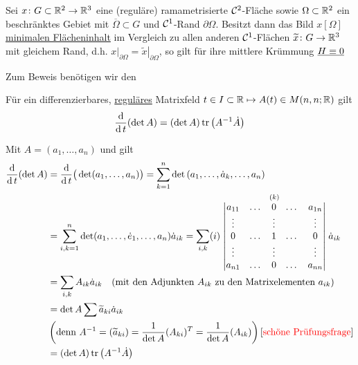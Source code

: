 \begin{satz}\label{satz261}
 Sei \(x \colon G \subset \mathbb{R}^2 \to \mathbb{R}^3\) eine (reguläre) ramametrisierte \(\mathcal{C}^2\)-Fläche sowie \(\Omega \subset \mathbb{R}^2\) ein beschränktes Gebiet mit \(\overline \Omega \subset G\) und \(\mathcal{C}^1\)-Rand \(\partial \Omega\). Besitzt dann das Bild \(x[\Omega]\) \uline{minimalen Flächeninhalt} im Vergleich zu allen anderen \(\mathcal{C}^1\)-Flächen \(\widetilde x \colon G \to \mathbb{R}^3\) mit gleichem Rand, d.h. \(\left. x \right|_{\partial \Omega} = \left. \widetilde x \right|_{\partial \Omega}\), so gilt für ihre mittlere Krümmung \(\uline{H \equiv 0}\)
\end{satz}

Zum Beweis benötigen wir den

\begin{hilfssatz}
 Für ein differenzierbares, \uline{reguläres} Matrixfeld \(t \in I \subset \mathbb{R} \mapsto A(t) \in M(n,n;\mathbb{R})\) gilt
 \[
  \frac{\operatorname{d}}{\operatorname{d} t}(\det A) = (\det A) \operatorname{tr}\left(A^{-1} \dot A\right)
 \]
\end{hilfssatz}

\begin{beweis}
 Mit \(A = (a_1, \dots, a_n)\) und  gilt
 \begin{align*}
  \frac{\operatorname{d}}{\operatorname{d} t} (\det A) &= \frac{\operatorname{d}}{\operatorname{d} t} \big( \det(a_1, \dots, a_n)\big) = \sum_{k = 1}^n \det\left(a_1, \dots, \dot a_k, \dots, a_n\right) \\
  &=\sum_{i,k = 1}^n \det (a_1, \dots, \dot e_1, \dots, a_n) \dot a_{ik} = \sum_{i,k} (i)\stackrel{(k)}{\left|\begin{matrix}
  				  a_{11} & \dots & 0      & \dots & a_{1n} \\
  				  \vdots & 		 & \vdots &       &\vdots  \\
  				  0      & \dots & 1      & \dots & 0      \\
 	       		  \vdots & 		 & \vdots &       &\vdots  \\
 	       		  a_{n1} & \dots & 0      & \dots & a_{nn}
  				 \end{matrix}\right|} \dot a_{ik} \\
  &= \sum_{i,k} A_{ik} \dot a_{ik} \quad (\text{mit den Adjunkten } A_{ik} \text{ zu den Matrixelementen }a_{ik}) \\
  &= \det A \sum \widetilde a_{ki} \dot a_{ik} \\
  &\left(\text{denn } A^{-1} = \left(\widetilde a_{ki}\right) = \frac1{\det A} (A_{ki})^T = \frac{1}{\det A} (A_{ik})\right)\text{[{\color{red}{schöne Prüfungsfrage}}]} \\
  &=(\det A) \operatorname{tr}\left(A^{-1} \dot A\right)
 \end{align*}
\end{beweis}

